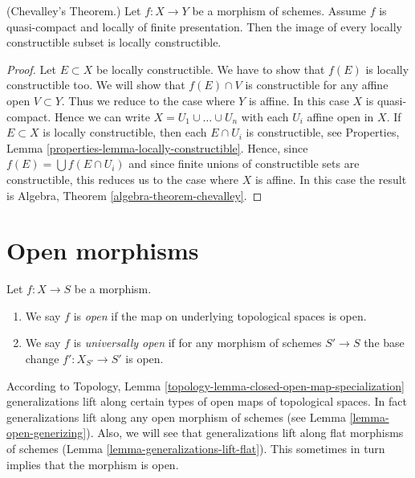\begin{theorem}
\label{theorem-chevalley}
(Chevalley's Theorem.)
Let $f : X \to Y$ be a morphism of schemes.
Assume $f$ is quasi-compact and locally of finite presentation.
Then the image of every locally constructible subset is locally constructible.
\end{theorem}

\begin{proof}
Let $E \subset X$ be locally constructible.
We have to show that $f(E)$ is locally constructible too.
We will show that $f(E) \cap V$ is constructible for any affine
open $V \subset Y$. Thus we reduce to the case where $Y$ is affine.
In this case $X$ is quasi-compact. Hence we can write
$X = U_1 \cup \ldots \cup U_n$ with each $U_i$ affine open in $X$.
If $E \subset X$ is locally constructible, then each $E \cap U_i$
is constructible, see
Properties, Lemma \ref{properties-lemma-locally-constructible}.
Hence, since $f(E) = \bigcup f(E \cap U_i)$ and since finite unions of
constructible sets are constructible, this reduces us to the case where $X$
is affine. In this case the result is
Algebra, Theorem \ref{algebra-theorem-chevalley}.
\end{proof}



\section{Open morphisms}
\label{section-open}

\begin{definition}
\label{definition-open}
Let $f : X \to S$ be a morphism.
\begin{enumerate}
\item We say $f$ is {\it open} if the map on underlying
topological spaces is open.
\item We say $f$ is {\it universally open} if for any morphism of
schemes $S' \to S$ the base change $f' : X_{S'} \to S'$ is open.
\end{enumerate}
\end{definition}

\noindent
According to
Topology, Lemma \ref{topology-lemma-closed-open-map-specialization}
generalizations lift along certain types of open maps of topological
spaces. In fact generalizations lift along any open morphism of schemes
(see
Lemma \ref{lemma-open-generizing}).
Also, we will see that generalizations lift along flat morphisms
of schemes (Lemma \ref{lemma-generalizations-lift-flat}).
This sometimes in turn implies that the morphism is open.

